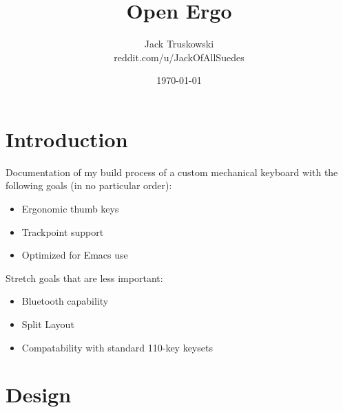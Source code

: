 \documentclass[a4paper,11pt]{scrartcl}
\title{Open Ergo}
\author{Jack Truskowski\\ reddit.com/u/JackOfAllSuedes}
\date{\today}
\begin{document}
\maketitle

%
\section{Introduction}

Documentation of my build process of a custom mechanical keyboard with
the following goals (in no particular order):

\begin{itemize}
\item Ergonomic thumb keys
\item Trackpoint support
\item Optimized for Emacs use
\end{itemize}

Stretch goals that are less important:

\begin{itemize}
\item Bluetooth capability
\item Split Layout
\item Compatability with standard 110-key keysets
\end{itemize}

\section{Design}
\end{document}
